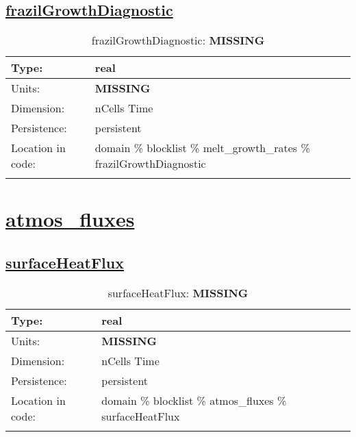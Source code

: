 \subsection[frazilGrowthDiagnostic]{\hyperref[sec:var_tab_melt_growth_rates]{frazilGrowthDiagnostic}}
\label{subsec:var_sec_melt_growth_rates_frazilGrowthDiagnostic}
\begin{center}
\begin{longtable}{| p{2.0in} | p{4.0in} |}
        \hline 
        Type: & real \\
        \hline 
        Units: & {\bf \color{red} MISSING} \\
        \hline 
        Dimension: & nCells Time \\
        \hline 
        Persistence: & persistent \\
        \hline 
         Location in code: & domain \% blocklist \% melt\_growth\_rates \% frazilGrowthDiagnostic \\
         \hline 
    \caption{frazilGrowthDiagnostic: {\bf \color{red} MISSING}}
\end{longtable}
\end{center}
\section[atmos\_fluxes]{\hyperref[sec:var_tab_atmos_fluxes]{atmos\_fluxes}}
\label{sec:var_sec_atmos_fluxes}
\subsection[surfaceHeatFlux]{\hyperref[sec:var_tab_atmos_fluxes]{surfaceHeatFlux}}
\label{subsec:var_sec_atmos_fluxes_surfaceHeatFlux}
\begin{center}
\begin{longtable}{| p{2.0in} | p{4.0in} |}
        \hline 
        Type: & real \\
        \hline 
        Units: & {\bf \color{red} MISSING} \\
        \hline 
        Dimension: & nCells Time \\
        \hline 
        Persistence: & persistent \\
        \hline 
         Location in code: & domain \% blocklist \% atmos\_fluxes \% surfaceHeatFlux \\
         \hline 
    \caption{surfaceHeatFlux: {\bf \color{red} MISSING}}
\end{longtable}
\end{center}
